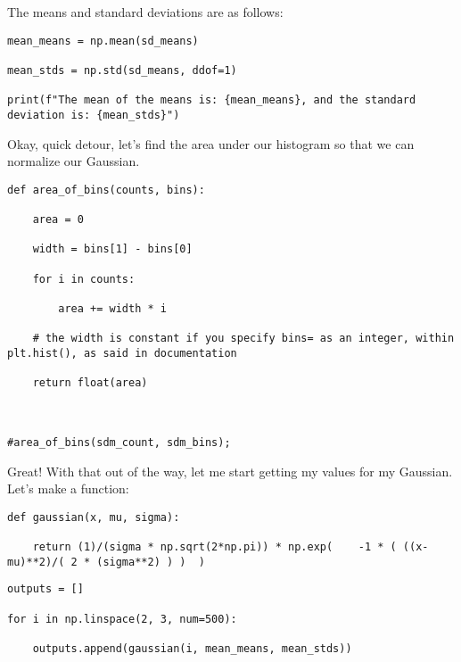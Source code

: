 \documentclass[12pt]{article}
\begin{document}
The means and standard deviations are as follows:


\begin{lstlisting}[frame=shadowbox]
mean_means = np.mean(sd_means)

mean_stds = np.std(sd_means, ddof=1)

print(f"The mean of the means is: {mean_means}, and the standard deviation is: {mean_stds}")
\end{lstlisting}
	


Okay, quick detour, let's find the area under our histogram so that we can normalize our Gaussian.


\begin{lstlisting}[frame=shadowbox]
def area_of_bins(counts, bins):

    area = 0

    width = bins[1] - bins[0]

    for i in counts:

        area += width * i

    # the width is constant if you specify bins= as an integer, within plt.hist(), as said in documentation

    return float(area)

    

#area_of_bins(sdm_count, sdm_bins);
\end{lstlisting}


Great! With that out of the way, let me start getting my values for my Gaussian. Let's make a function:


\begin{lstlisting}[frame=shadowbox]
def gaussian(x, mu, sigma):

    return (1)/(sigma * np.sqrt(2*np.pi)) * np.exp(    -1 * ( ((x-mu)**2)/( 2 * (sigma**2) ) )  )
\end{lstlisting}


\begin{lstlisting}[frame=shadowbox]
outputs = []

for i in np.linspace(2, 3, num=500):

    outputs.append(gaussian(i, mean_means, mean_stds))
\end{lstlisting}

\end{document}
